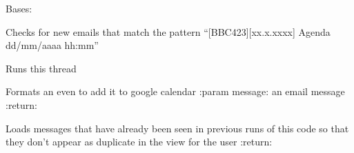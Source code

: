 \documentclass[letterpaper,10pt,english]{sphinxmanual}
\begin{document}
\begin{fulllineitems}
\label{push_email:push_email.utils.EmailThread}
Bases: 

\begin{fulllineitems}
\label{push_email:push_email.utils.EmailThread.check_for_new_emails}
Checks for new emails that match the pattern ``{[}BBC423{]}{[}xx.x.xxxx{]} Agenda dd/mm/aaaa hh:mm''

\end{fulllineitems}


\begin{fulllineitems}
\label{push_email:push_email.utils.EmailThread.run}
Runs this thread

\end{fulllineitems}


\end{fulllineitems}


\begin{fulllineitems}
\label{push_email:push_email.utils.add_to_calendar}
Formats an even to add it to google calendar
:param message: an email message
:return:

\end{fulllineitems}


\begin{fulllineitems}
\label{push_email:push_email.utils.load_already_seen}
Loads messages that have already been seen in previous runs of this
code so that they don't appear as duplicate in the view for the user
:return:

\end{fulllineitems}

\end{document}

